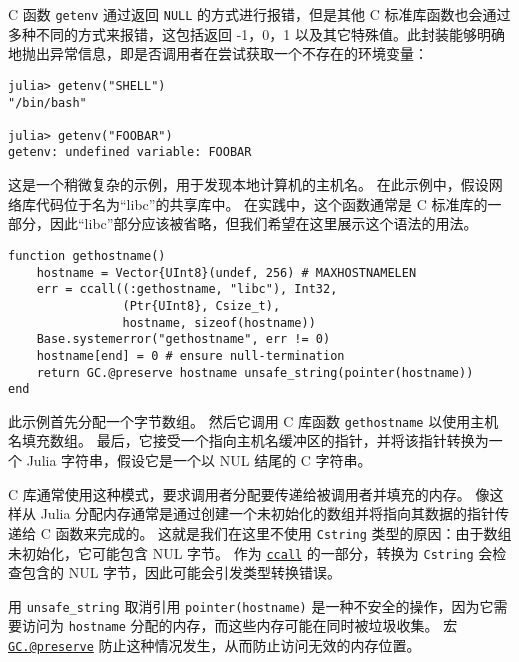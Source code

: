 C 函数 \texttt{getenv} 通过返回 \texttt{NULL} 的方式进行报错，但是其他 C 标准库函数也会通过多种不同的方式来报错，这包括返回 -1，0，1 以及其它特殊值。此封装能够明确地抛出异常信息，即是否调用者在尝试获取一个不存在的环境变量：




\begin{verbatim}
julia> getenv("SHELL")
"/bin/bash"

julia> getenv("FOOBAR")
getenv: undefined variable: FOOBAR
\end{verbatim}



这是一个稍微复杂的示例，用于发现本地计算机的主机名。 在此示例中，假设网络库代码位于名为“libc”的共享库中。 在实践中，这个函数通常是 C 标准库的一部分，因此“libc”部分应该被省略，但我们希望在这里展示这个语法的用法。




\begin{verbatim}
function gethostname()
    hostname = Vector{UInt8}(undef, 256) # MAXHOSTNAMELEN
    err = ccall((:gethostname, "libc"), Int32,
                (Ptr{UInt8}, Csize_t),
                hostname, sizeof(hostname))
    Base.systemerror("gethostname", err != 0)
    hostname[end] = 0 # ensure null-termination
    return GC.@preserve hostname unsafe_string(pointer(hostname))
end
\end{verbatim}



此示例首先分配一个字节数组。 然后它调用 C 库函数 \texttt{gethostname} 以使用主机名填充数组。 最后，它接受一个指向主机名缓冲区的指针，并将该指针转换为一个 Julia 字符串，假设它是一个以 NUL 结尾的 C 字符串。



C 库通常使用这种模式，要求调用者分配要传递给被调用者并填充的内存。 像这样从 Julia 分配内存通常是通过创建一个未初始化的数组并将指向其数据的指针传递给 C 函数来完成的。 这就是我们在这里不使用 \texttt{Cstring} 类型的原因：由于数组未初始化，它可能包含 NUL 字节。 作为 \hyperlink{14245046751182637566}{\texttt{ccall}} 的一部分，转换为 \texttt{Cstring} 会检查包含的 NUL 字节，因此可能会引发类型转换错误。



用 \texttt{unsafe\_string} 取消引用 \texttt{pointer(hostname)} 是一种不安全的操作，因为它需要访问为 \texttt{hostname} 分配的内存，而这些内存可能在同时被垃圾收集。 宏 \hyperlink{6484353991353718972}{\texttt{GC.@preserve}} 防止这种情况发生，从而防止访问无效的内存位置。




